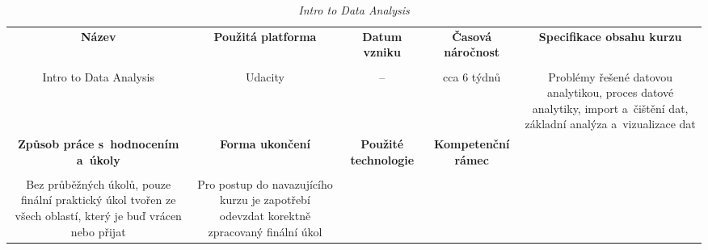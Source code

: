 \begin{landscape}

\begin{table}[htbp]

\renewcommand\thetable{3}

\caption{\textit{Intro to Data Analysis}}\label{tab2}

\footnotesize

{

\justifying

\begin{tabularx}{\linewidth}{CCCCC}

\toprule

\textbf{Název} &

\textbf{Použitá platforma} &

\textbf{Datum vzniku} &

\textbf{Časová náročnost} &
 
\textbf{Specifikace obsahu kurzu}

\\

\tabularnewline
\midrule

Intro to Data Analysis

&

Udacity

&

–

&

cca 6 týdnů

&

Problémy řešené datovou analytikou, proces datové analytiky, import a~čištění dat, základní analýza a~vizualizace dat

\\
\toprule

\textbf{Způsob práce s~hodnocením a~úkoly} &

\textbf{Forma ukončení} &

\textbf{Použité technologie} &

\textbf{Kompetenční rámec} 

\\

\tabularnewline
\midrule

Bez průběžných úkolů, pouze finální praktický úkol tvořen ze všech oblastí, který je buď vrácen nebo přijat

&

Pro postup do navazujícího kurzu je zapotřebí odevzdat korektně zpracovaný finální úkol

&


\end{tabularx}}
\end{table}
\end{landscape}
